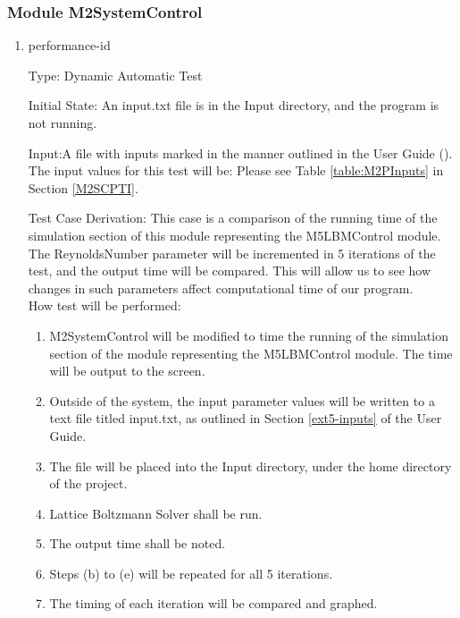 \documentclass[12pt, titlepage]{article}
\newcommand{\myprogname}{Lattice Boltzmann Solver}
\newcounter{uvtestcounter} %
\begin{document}
\subsubsection{Module M2SystemControl}
\label{M2performance}
		
\begin{enumerate}

\item{performance-id\theuvtestcounter\\}

Type: Dynamic Automatic Test

Initial State: An input.txt file is in the Input directory, and the program is not running.

Input:A file with inputs marked in the manner outlined in the
User Guide (\citet{LBM_UserGuide_PM}).\\The input values for this test will
be: Please see Table \ref{table:M2PInputs} in Section \ref{M2SCPTI}.

Test Case Derivation: This case is a comparison of the running time of the simulation section of this module representing the M5LBMControl module.  
The ReynoldsNumber parameter will be incremented in 5 iterations of the test, and the output time will be compared. This will allow us to see how changes in such parameters affect computational time of our program.\\

How test will be performed:
\begin{enumerate}
	\item M2SystemControl will be modified to time the running of the simulation section of the module representing the M5LBMControl module. The time will be output to the screen.
	\item Outside of the system, the input parameter values will be written to a text file titled input.txt, as outlined in Section \ref{ext5-inputs} of the User Guide.
	\item The file will be placed into the Input directory, under the home directory of the project.
	\item {\myprogname} shall be run. 
	\item The output time shall be noted.
	\item Steps (b) to (e) will be repeated for all 5 iterations.
	\item The timing of each iteration will be compared and graphed.
\end{enumerate}

\end{enumerate}
\end{document}
